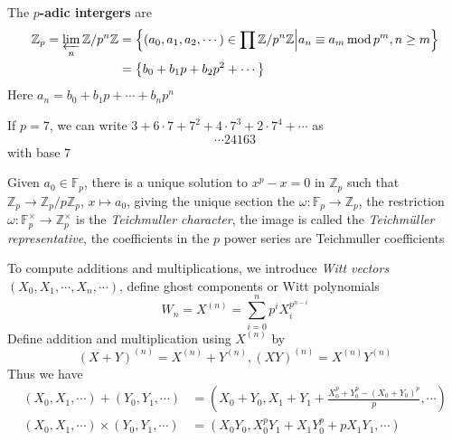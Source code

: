 \documentclass[main]{subfiles}
\begin{document}
\begin{definition}
The $p$\textbf{-adic intergers} are
\begin{align*}
\mathbb Z_p=\varprojlim_n\mathbb Z/p^n\mathbb Z&=\left\{(a_0,a_1,a_2,\cdots)\in\prod\mathbb Z/p^n\mathbb Z\middle|a_n\equiv a_m\mod p^m,n\geq m\right\} \\
&=\left\{b_0+b_1p+b_2p^2+\cdots\right\}
\end{align*}
Here $a_n=b_0+b_1p+\cdots+b_np^n$
\end{definition}

\begin{example}
If $p=7$, we can write $3+6\cdot 7+7^2+4\cdot 7^3+2\cdot7^4+\cdots$ as
\[\cdots24163\]
with base $7$
\end{example}

\begin{definition}
Given $a_0\in\mathbb F_p$, there is a unique solution to $x^p-x=0$ in $\mathbb Z_p$ such that $\mathbb Z_p\to\mathbb Z_p/p\mathbb Z_p$, $x\mapsto a_0$, giving the unique section the $\omega:\mathbb F_p\to\mathbb Z_p$, the restriction $\omega:\mathbb F_p^\times\to\mathbb Z_p^\times$ is the \textit{Teichmuller character}, the image is called the \textit{Teichm\"uller representative}, the coefficients in the $p$ power series are Teichmuller coefficients
\end{definition}

\begin{definition}
To compute additions and multiplications, we introduce \textit{Witt vectors} $(X_0,X_1,\cdots,X_n,\cdots)$, define ghost components or Witt polynomials
\[W_n=X^{(n)}=\sum_{i=0}^np^iX_i^{p^{n-i}}\]
Define addition and multiplication using $X^{(n)}$ by
\[(X+Y)^{(n)}=X^{(n)}+Y^{(n)},(XY)^{(n)}=X^{(n)}Y^{(n)}\]
Thus we have
\begin{align*}
(X_0,X_1,\cdots)+(Y_0,Y_1,\cdots)&=\left(X_0+Y_0,X_1+Y_1+\frac{X_0^p+Y_0^p-(X_0+Y_0)^p}{p},\cdots\right) \\
(X_0,X_1,\cdots)\times(Y_0,Y_1,\cdots)&=(X_0Y_0,X_0^pY_1+X_1Y_0^p+pX_1Y_1,\cdots)
\end{align*}
\end{definition}
\end{document}
